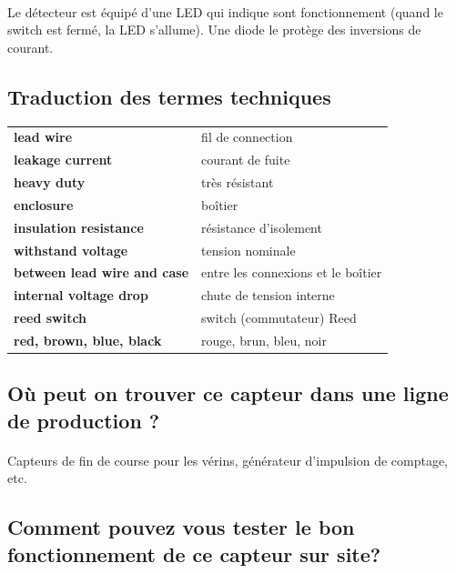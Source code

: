 \documentclass{article}
\begin{document}
\paragraph{}
Le détecteur est équipé d'une LED qui indique sont fonctionnement (quand le switch est fermé, la LED s'allume). Une diode le protège des inversions de courant.

\subsection{Traduction des termes techniques}
\begin{table}[H]
    \begin{center}
        \begin{tabular}{l l}
            \textbf{lead wire} & fil de connection \\
            \textbf{leakage current} & courant de fuite \\
            \textbf{heavy duty} & très résistant \\
            \textbf{enclosure} & boîtier \\
            \textbf{insulation resistance} & résistance d'isolement\\
            \textbf{withstand voltage} & tension nominale\\
            \textbf{between lead wire and case} & entre les connexions et le boîtier\\
            \textbf{internal voltage drop} & chute de tension interne\\
            \textbf{reed switch} & switch (commutateur) Reed\\
            \textbf{red, brown, blue, black} & rouge, brun, bleu, noir\\
        \end{tabular}
    \end{center}
\end{table}

\subsection{Où peut on trouver ce capteur dans une ligne de production ?}
\paragraph{}
Capteurs de fin de course pour les vérins, générateur d'impulsion de comptage, etc.

\subsection{Comment pouvez vous tester le bon fonctionnement de ce capteur sur site?}
\end{document}
